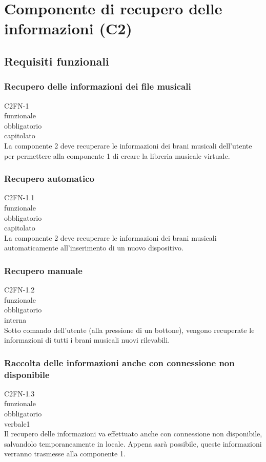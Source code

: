 \newpage


\section{Componente di recupero delle informazioni (C2)}

\subsection{Requisiti funzionali}
\subsubsection*{Recupero delle informazioni dei file musicali}
 C2FN-1 \\
 funzionale \\
 obbligatorio \\
 capitolato \\
La componente 2 deve recuperare le informazioni dei brani musicali dell'utente
per permettere alla componente 1 di creare la libreria musicale virtuale.

\subsubsection*{Recupero automatico}
 C2FN-1.1 \\
 funzionale \\
 obbligatorio \\
 capitolato \\
La componente 2 deve recuperare le informazioni dei brani musicali
automaticamente all'inserimento di un nuovo dispositivo.

\subsubsection*{Recupero manuale}
 C2FN-1.2 \\
 funzionale \\
 obbligatorio \\
 interna \\
Sotto comando dell'utente (alla pressione di un bottone), vengono recuperate le
informazioni di tutti i brani musicali nuovi rilevabili.

\subsubsection*{Raccolta delle informazioni anche con connessione non disponibile}
 C2FN-1.3 \\
 funzionale \\
 obbligatorio \\
 verbale1 \\
Il recupero delle informazioni va effettuato anche con connessione non
disponibile, salvandolo temporaneamente in locale. Appena sar\`a possibile, queste
informazioni verranno trasmesse alla componente 1.

